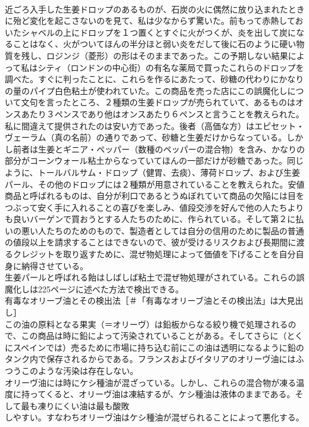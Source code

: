 \documentclass[8pt]{extreport}
\begin{document}
\begin{CJK}{UTF8}{min}
\\	近ごろ入手した生姜ドロップのあるものが、石炭の火に偶然に放り込まれたときに殆ど変化を起こさないのを見て、私は少なからず驚いた。前もって赤熱しておいたシャベルの上にドロップを１つ置くとすぐに火がつくが、炎を出して炭になることはなく、火がついてほんの半分ほと弱い炎をだして後に石のように硬い物質を残し、ロジンジ（菱形）の形はそのままであった。この予期しない結果によって私はシティ（ロンドンの中心街）の有名な薬局で買ったこれらのドロップを調べた。すぐに判ったことに、これらを作るにあたって、砂糖の代わりにかなりの量のパイプ白色粘土が使われていた。この商品を売った店にこの誤魔化しについて文句を言ったところ、２種類の生姜ドロップが売られていて、あるものはオンスあたり３ペンスであり他はオンスあたり６ペンスと言うことを教えられた。私に間違えて提供されたのは安い方であった。後者（高価な方）はエピセット・ヴェーラム（真の名前）の通りであって、砂糖と生姜だけからなっている。しかし前者は生姜とギニア・ペッパー（数種のペッパーの混合物）を含み、かなりの部分がコーンウォール粘土からなっていてほんの一部だけが砂糖であった。同じように、トールバルサム・ドロップ（健胃、去痰）、薄荷ドロップ、および生姜パール、その他のドロップには２種類が用意されていることを教えられた。安値商品と呼ばれるものは、自分が利口であるとうぬぼれていて商品の欠陥には目をつぶって安く手に入れることの喜びを楽しみ、値段交渉を好んで他の人たちよりも良いバーゲンで買おうとする人たちのために、作られている。そして第２に払いの悪い人たちのためのもので、製造者としては自分の信用のために製品の普通の値段以上を請求することはできないので、彼が受けるリスクおよび長期間に渡るクレジットを取り返すために、混ぜ物処理によって価値を下げることを自分自身に納得させている。
\\	生姜パールと呼ばれる飴はしばしば粘土で混ぜ物処理がされている。これらの誤魔化しは225ページに述べた方法で検出できる。
\\	有毒なオリーブ油とその検出法［＃「有毒なオリーブ油とその検出法」は大見出し］
\\	この油の原料となる果実（＝オリーヴ）は鉛板からなる絞り機で処理されるので、この商品は時に鉛によって汚染されていることがある。そしてさらに（とくにスペインでは）売るために市場に持ち込む前にこの油は透明になるように鉛のタンク内で保存されるからである。フランスおよびイタリアのオリーヴ油にはふつうこのような汚染は存在しない。
\\	オリーヴ油には時にケシ種油が混ざっている。しかし、これらの混合物が凍る温度に持ってくると、オリーヴ油は凍結するが、ケシ種油は液体のままである。そして最も凍りにくい油は最も酸敗
\\	しやすい。すなわちオリーヴ油はケシ種油が混ぜられることによって悪化する。

\end{CJK}
\end{document}

